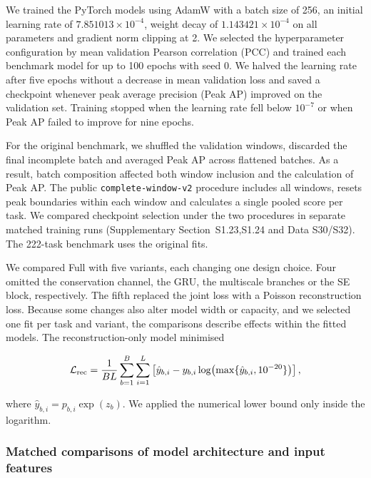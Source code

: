 \documentclass[webpdf,contemporary,large]{current_assets/oup-authoring-template}
\newcommand{\supsect}[1]{Supplementary Section~#1}
\begin{document}
We trained the PyTorch models using AdamW with a batch size of 256, an initial learning rate of $7.851013\times10^{-4}$, weight decay of $1.143421\times10^{-4}$ on all parameters and gradient norm clipping at 2. We selected the hyperparameter configuration by mean validation Pearson correlation (PCC) and trained each benchmark model for up to 100 epochs with seed 0. We halved the learning rate after five epochs without a decrease in mean validation loss and saved a checkpoint whenever peak average precision (Peak AP) improved on the validation set. Training stopped when the learning rate fell below $10^{-7}$ or when Peak AP failed to improve for nine epochs.

For the original benchmark, we shuffled the validation windows, discarded the final incomplete batch and averaged Peak AP across flattened batches. As a result, batch composition affected both window inclusion and the calculation of Peak AP. The public \texttt{complete-window-v2} procedure includes all windows, resets peak boundaries within each window and calculates a single pooled score per task. We compared checkpoint selection under the two procedures in separate matched training runs (\supsect{S1.23,S1.24} and Data S30/S32). The 222-task benchmark uses the original fits.

We compared Full with five variants, each changing one design choice. Four omitted the conservation channel, the GRU, the multiscale branches or the SE block, respectively. The fifth replaced the joint loss with a Poisson reconstruction loss. Because some changes also alter model width or capacity, and we selected one fit per task and variant, the comparisons describe effects within the fitted models. The reconstruction-only model minimised

\begin{equation}
\mathcal L_{\rm rec}=\frac1{BL}\sum_{b=1}^{B}\sum_{i=1}^{L}
\left[\hat y_{b,i}-y_{b,i}\log\!\left(\max\{\hat y_{b,i},10^{-20}\}\right)\right],
\label{eq:reconstruction_loss}
\end{equation}

where $\hat y_{b,i}=p_{b,i}\exp(z_b)$. We applied the numerical lower bound only inside the logarithm.

\subsubsection{Matched comparisons of model architecture and input features}
\end{document}
